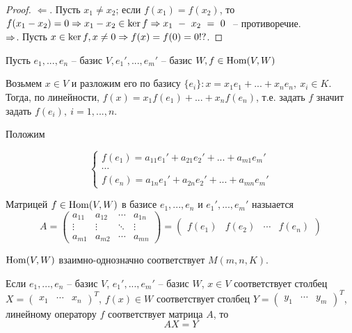 \begin{proof}
	$\Leftarrow$. Пусть $x_1 \neq x_2$; если $f(x_1) = f(x_2)$, то $f(x_1 - x_2) = 0 \Rightarrow x_1 - x_2 \in \ker f \Rightarrow x_1~-~x_2~=~0~$ -- противоречие.  \\
	$\Rightarrow$. Пусть $x \in \ker f, x \neq 0 \Rightarrow f(x) = f(0) = 0 !?$.  
\end{proof}


Пусть $e_1, ..., e_n$ -- базис $V, e_1', ..., e_m'$ -- базис $W, f \in \operatorname{Hom} (V, W)$

Возьмем $x \in V$ и разложим его по базису $\{e_i\} : x = x_1 e_1 + ... + x_n e_n, \ x_i \in K$. 
Тогда, по линейности, $f(x) = x_1 f(e_1) + ... + x_n f(e_n)$, т.е. задать $f$ значит задать $f(e_i), \ i=1, ..., n$. 

Положим


\[\begin{cases}
	f(e_1) = a_{11} e_1' + a_{21} e_2' + ... + a_{m1} e_m' \\
	\cdots \\
	f(e_n) = a_{1n} e_1' + a_{2n} e_2' + ... + a_{mn} e_m'
\end{cases}\]

\begin{Def}
	Матрицей $f \in \operatorname{Hom}(V, W)$ в базисе $e_1, ..., e_n$ и $e_1', ..., e_m'$ назыается 
	\[A=\left(\begin{array}{cccc}
	a_{11} & a_{12} & \cdots & a_{1n} \\ 
	\vdots & \vdots & \ddots & \vdots \\ 
	a_{m1} & a_{m2} & \cdots & a_{mn}
	\end{array}\right) = \left(\begin{array}{cccc}
	f(e_1) & f(e_2) & \cdots & f(e_n)
	\end{array}\right)\]
\end{Def}

\begin{Thm}
	\begin{MyList}
		\item $\operatorname{Hom}(V, W)$ взаимно-однозначно соответствует $M(m, n, K)$.
		\item Если $e_1, ..., e_n$ -- базис $V$, $e_1', ..., e_m'$ -- базис $W$, $x \in V$ соответствует столбец $X = \left(\begin{array}{ccc}
		x_1  & \cdots & x_n
		\end{array}\right)^T$, $f(x) \in W$ соответствует столбец $Y = \left(\begin{array}{ccc}
		y_1 & \cdots & y_m
		\end{array}\right)^T$, линейному оператору $f$ соответствует матрица $A$, то
		\[AX = Y\]
	\end{MyList}
\end{Thm}

